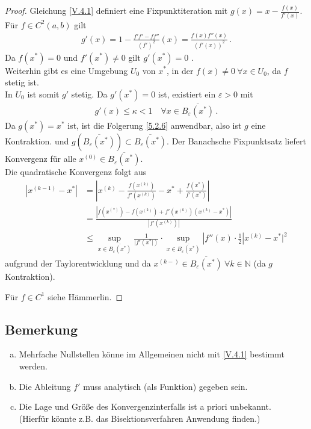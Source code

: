 \documentclass[ngerman,fontsize=11pt, paper=a4, parskip=half, titlepage=true, toc=bib]{scrbook}
\newcommand{\N}{\mathds{N}}
\begin{document}
  \begin{proof}
    Gleichung \eqref{V.4.1} definiert eine Fixpunktiteration mit $g(x) = x-\frac{f(x)}{f'(x)}$.\\
    Für $f\in C^2(a,b)$ gilt 
    \begin{gather*}
      g'(x) = 1- \frac{f'f'-ff''}{(f')^2}(x)= \frac{f(x)f''(x)}{(f'(x))^2}\, .
    \end{gather*}
    Da $f(x^{*})= 0$ und $f'(x^{*})\neq 0$ gilt $g'(x^{*})=0$ .\\
    Weiterhin gibt es eine Umgebung $U_0$ von $x^{*}$, in der $f(x)\neq 0~\forall x\in U_0$,
    da $f$ stetig ist.\\
    In $U_0$ ist somit $g' $ stetig. Da $g'(x^{*})=0$ ist, existiert ein $\varepsilon>0$ mit
    \begin{gather*}
      g'(x)\leq \kappa<1 \quad \forall x\in \overline{B_\varepsilon(x^{*})}\, .
    \end{gather*}
    Da $g(x^{*})=x^{*}$ ist, ist die Folgerung \ref{5.2.6} anwendbar,
    also ist $g$ eine Kontraktion. und $g(\overline{B_\varepsilon(x^{*})}) \subset \overline{B_\varepsilon(x^{*})}$.
    Der Banachsche Fixpunktsatz liefert Konvergenz für alle $x^{(0)}\in\overline{B_\varepsilon(x^{*})}$. \\
    
    Die quadratische Konvergenz folgt aus 
    \begin{align*}
      |x^{(k-1)}-x^{*}| &= |x^{(k)}-\frac{f(x^{(k)})}{f'(x^{(k)})}-x^{*}+\frac{f(x^{*})}{f'(x^{*})}| \\
                        &= \frac{|f(x^{(*)})-f(x^{(k)})+f'(x^{(k)})(x^{(k)}-x^{*})|}{|f'(x^{(k)})|}\\
                        &\leq \sup_{x\in\overline{B_\varepsilon(x^{*})}}\frac{1}{|f'(x^{*}|)}
                          \cdot \sup_{x\in\overline{B_\varepsilon(x^{*})}}|f''(x)\cdot\frac{1}{2}|x^{(k)}-x^{*}|^2
    \end{align*}
    aufgrund der Taylorentwicklung und da
    $x^{(k-)}\in\overline{B_\varepsilon(x^{*})}~\forall k\in\N$ (da $g$ Kontraktion).
    
    Für $f\in C^1$ siehe Hämmerlin\cite{haemmerlinhoffmann}.
  \end{proof}
  
  \subsection{Bemerkung}
  \begin{enumerate}[a)]
  \item Mehrfache Nullstellen könne im Allgemeinen
    nicht mit \eqref{V.4.1} bestimmt werden.
  \item Die Ableitung $f'$ muss analytisch (als Funktion) gegeben sein.
  \item Die Lage und Größe des Konvergenzinterfalls ist a priori unbekannt.\\
    (Hierfür könnte z.B. das Bisektionsverfahren Anwendung finden.)
  \end{enumerate}
  
\end{document}
